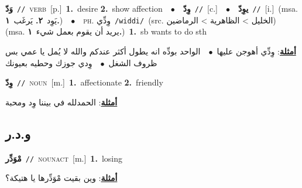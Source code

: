 \documentclass[10pt,a4paper,twoside]{article} %
\begin{document}
\begin{multicols}{2}
{\setlength\topsep{0pt}\textbf{\foreignlanguage{arabic}{وَدّ}}\ {\color{gray}\texttt{//}\color{black}}\ \textsc{verb}\ [p.]\ \textbf{1.}~desire  \textbf{2.}~show affection\ \ $\bullet$\ \ \setlength\topsep{0pt}\textbf{\foreignlanguage{arabic}{وِدّ}}\ {\color{gray}\texttt{//}\color{black}}\ [c.]\ \ $\bullet$\ \ \setlength\topsep{0pt}\textbf{\foreignlanguage{arabic}{يوِدّ}}\ {\color{gray}\texttt{//}\color{black}}\ [i.]\ \color{gray}(msa. \foreignlanguage{arabic}{يَوِد}~\foreignlanguage{arabic}{\textbf{٢.}}  \foreignlanguage{arabic}{يَرغَب}~\foreignlanguage{arabic}{\textbf{١.}})\color{black}\ \ $\bullet$\ \ \textsc{ph.} \color{gray} \foreignlanguage{arabic}{وِدِّي}\color{black}\ {\color{gray}\texttt{/{\sffamily widdi}/}\color{black}}\ \color{gray}(src. \foreignlanguage{arabic}{الخليل > الظاهرية > الرماضين})\color{black}\ \color{gray} (msa. \foreignlanguage{arabic}{يريد أن يقوم بعمل شيء}~\foreignlanguage{arabic}{\textbf{١.}})\color{black}\ \textbf{1.}~sb wants to do sth\  \begin{flushright}\color{gray}\foreignlanguage{arabic}{\textbf{\underline{\foreignlanguage{arabic}{أمثلة}}}: وِدِّي أهوجن عليها\ $\bullet$\ \  الواحد بودِّه انه يطول أكثر عندكم والله لا يُمل يا عمي بس ظروف الشغل\ $\bullet$\ \  وِدي جوزك وحطيه بعيونك}\end{flushright}\color{black}} \vspace{2mm}

{\setlength\topsep{0pt}\textbf{\foreignlanguage{arabic}{وِدّ}}\ {\color{gray}\texttt{//}\color{black}}\ \textsc{noun}\ [m.]\ \textbf{1.}~affectionate  \textbf{2.}~friendly\  \begin{flushright}\color{gray}\foreignlanguage{arabic}{\textbf{\underline{\foreignlanguage{arabic}{أمثلة}}}: الحمدلله في بيننا وِد ومحبة}\end{flushright}\color{black}} \vspace{2mm}

\vspace{-3mm}
\subsection*{\color{blue}\foreignlanguage{arabic}{و.د.ر}\color{blue}{}} 

{\setlength\topsep{0pt}\textbf{\foreignlanguage{arabic}{مْوَدِّر}}\ {\color{gray}\texttt{//}\color{black}}\ \textsc{noun\textunderscore act}\ [m.]\ \textbf{1.}~losing\  \begin{flushright}\color{gray}\foreignlanguage{arabic}{\textbf{\underline{\foreignlanguage{arabic}{أمثلة}}}: وين بقيت مْوَدِّرها يا هتيكة؟}\end{flushright}\color{black}} \vspace{2mm}


\end{multicols}
\end{document}
